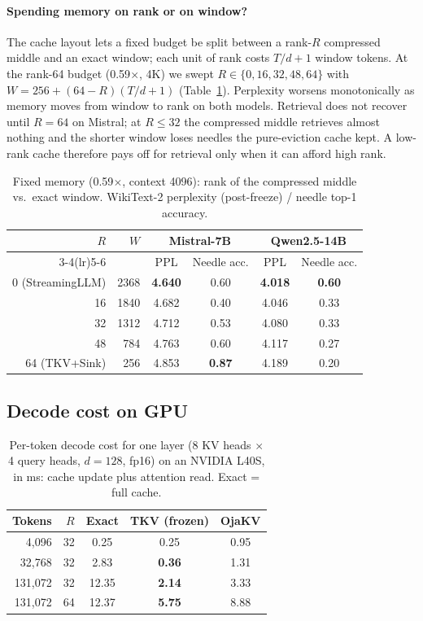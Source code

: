 \documentclass{article}
\begin{document}
\paragraph{Spending memory on rank or on window?}
The cache layout lets a fixed budget be split between a rank-$R$ compressed
middle and an exact window; each unit of rank costs $T/d + 1$ window tokens.
At the rank-64 budget (0.59$\times$, 4K) we swept $R\in\{0,16,32,48,64\}$
with $W = 256 + (64{-}R)(T/d{+}1)$ (Table~\ref{tab:hybrid}). Perplexity
worsens monotonically as memory moves from window to rank on both models.
Retrieval does not recover until $R=64$ on Mistral; at $R\le 32$ the
compressed middle retrieves almost nothing and the shorter window loses needles
the pure-eviction cache kept. A low-rank cache therefore pays off for
retrieval only when it can afford high rank.

\begin{table}[t]
\centering
\caption{Fixed memory (0.59$\times$, context 4096): rank of the compressed
middle vs.\ exact window. WikiText-2 perplexity (post-freeze) / needle top-1
accuracy.}
\label{tab:hybrid}
\small
\begin{tabular}{rrcccc}
\toprule
$R$ & $W$ & \multicolumn{2}{c}{Mistral-7B} & \multicolumn{2}{c}{Qwen2.5-14B} \\
\cmidrule(lr){3-4}\cmidrule(lr){5-6}
& & PPL & Needle acc. & PPL & Needle acc. \\
\midrule
0 (StreamingLLM) & 2368 & \textbf{4.640} & 0.60 & \textbf{4.018} & \textbf{0.60} \\
16 & 1840 & 4.682 & 0.40 & 4.046 & 0.33 \\
32 & 1312 & 4.712 & 0.53 & 4.080 & 0.33 \\
48 &  784 & 4.763 & 0.60 & 4.117 & 0.27 \\
64 (TKV+Sink) & 256 & 4.853 & \textbf{0.87} & 4.189 & 0.20 \\
\bottomrule
\end{tabular}
\end{table}

\subsection{Decode cost on GPU}
\label{sec:latency}

\begin{table}[t]
\centering
\caption{Per-token decode cost for one layer (8 KV heads $\times$ 4 query
heads, $d{=}128$, fp16) on an NVIDIA L40S, in ms: cache update plus attention
read. Exact = full cache.}
\label{tab:latency}
\small
\begin{tabular}{rrccc}
\toprule
Tokens & $R$ & Exact & TKV (frozen) & OjaKV \\
\midrule
4,096   & 32 & 0.25 & 0.25 & 0.95 \\
32,768  & 32 & 2.83 & \textbf{0.36} & 1.31 \\
131,072 & 32 & 12.35 & \textbf{2.14} & 3.33 \\
131,072 & 64 & 12.37 & \textbf{5.75} & 8.88 \\
\bottomrule
\end{tabular}
\end{table}
\end{document}
